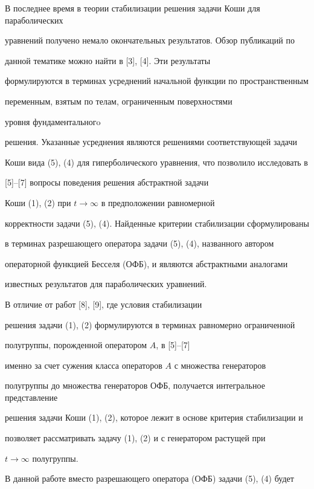 В последнее время в теории стабилизации решения задачи Коши для параболических 


уравнений получено немало окончательных результатов. Обзор публикаций по


данной тематике можно найти в [3], [4]. Эти результаты 


формулируются в терминах усреднений начальной функции по пространственным


переменным, взятым по телам, ограниченным поверхностями 


уровня фундаментальногo


решения. Указанные усреднения являются решениями соответствующей задачи 


Коши вида (5), (4) для гиперболического уравнения, что позволило исследовать в 


[5]--[7] вопросы поведения решения абстрактной задачи 


Коши (1), (2) при $t \to \infty$ в предположении равномерной 


корректности задачи (5), (4). Найденные критерии стабилизации сформулированы 


в терминах разрешающего оператора задачи (5), (4), названного автором


операторной функцией Бесселя (ОФБ), и являются абстрактными аналогами


известных результатов для параболических уравнений.





В отличие от работ [8], [9], где условия стабилизации 


решения задачи (1), (2) формулируются в терминах равномерно ограниченной 


полугруппы, порожденной оператором $A$, в [5]--[7]


именно за счет сужения класса операторов $A$ с множества генераторов 


полугруппы до множества генераторов ОФБ, получается интегральное представление 


решения задачи Коши (1), (2), которое лежит в основе критерия стабилизации и 


позволяет рассматривать задачу (1), (2) и с генератором растущей при


$t \to \infty$ полугруппы.





В данной работе вместо разрешающего оператора (ОФБ) задачи (5), (4) будет 


